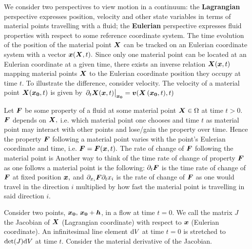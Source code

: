 We consider two perspectives to view motion in a continuum: the \textbf{Lagrangian} perspective expresses position, velocity and other state variables in terms of material points travelling with a fluid; the \textbf{Eulerian} perspective expresses fluid properties with respect to some reference coordinate system. The time evolution of the position of the material point $\boldsymbol{X}$ can be tracked on an Eulerian coordinate system with a vector $\boldsymbol{x}(\boldsymbol{X},t).$ Since only one material point can be located at an Eulerian coordinate at a given time, there exists an inverse relation $\boldsymbol{X}(\boldsymbol{x},t)$ mapping material points $\boldsymbol{X}$ to the Eulerian coordinate position they occupy at time $t.$  To illustrate the difference, consider velocity. The velocity of a material point $\boldsymbol{X}(\boldsymbol{x_0},t)$ is given by $\eval{\p_{t}\vect{X}(\vect{x},t)}_{\vect{x_0}} = \vect{v}(\vect{X}\left(\vect{x_0},t),t\right)$

Let $\boldsymbol{F}$ be some property of a fluid at some material point $\boldsymbol{X}\in\Omega$ at time $t>0$. $\boldsymbol{F}$ depends on $\boldsymbol{X},$ i.e. which material point one chooses and time $t$ as material point may interact with other points and lose/gain the property over time. Hence the property $\boldsymbol{F}$ following a material point varies with the point's Eulerian coordinate and time, i.e. $\boldsymbol{F}=\boldsymbol{F}(\boldsymbol{x},t).$ The rate of change of $\boldsymbol{F}$ following the material point is
Another way to think of the time rate of change of property $\boldsymbol{F}$ as one follows a material point is the following: $\partial_{t}\boldsymbol{F}$ is the time rate of change of $\boldsymbol{F}$ at fixed position $\boldsymbol{x},$ and $\partial_{x_i}\boldsymbol{F}\partial_t x_i$ is the rate of change of $\boldsymbol{F}$ as one would travel in the direction $i$ multiplied by how fast the material point is travelling in said direction $i.$

Consider two points, $\boldsymbol{x_0},\,\boldsymbol{x_0}+\boldsymbol{h}$, in a flow at time $t=0$. We call the matrix $J$ the Jacobian of $\boldsymbol{X}$ (Lagrangian coordinate) with respect to $\boldsymbol{x}$ (Eulerian coordinate).
An infinitesimal line element $\mathrm{d} V$ at time $t=0$ is stretched to $\det(J)\mathrm{d} V$ at time $t$. Consider the material derivative of the Jacobian. \todo{}

